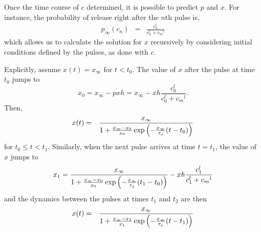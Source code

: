 \documentclass[10pt]{article}
\begin{document}
Once the time course of $c$ determined, it is possible to predict $p$ and $x$. For instance, the probability of release right after the $n$th pulse is,
\begin{eqnarray}
p_{\infty}(c_n) &=& \frac{c_n^l}{c_n ^l + {c_m}^l} 
\end{eqnarray}
which allows us to calculate the solution for $x$ recursively by considering initial conditions defined by the pulses, as done with $c$. 

Explicitly, assume $x(t) = x_{\infty}$ for $t<t_0$.  The value of $x$ after the pulse at time $t_0$ jumps to 
$$
x_0 = x_{\infty} - p x h = x_{\infty} - x h \frac{c_0^l}{c_0^l + {c_m}^l}. 
$$
Then, 
\begin{eqnarray}
x(t) &=& \frac{x_{\infty}}{1 + \frac{x_{\infty}- x_0}{x_0}\exp\left(-\frac{x_{\infty}}{\tau_x} (t-t_0)\right)}
\end{eqnarray}
for $t_0\leq t < t_1$. Similarly, when the next pulse arrives at time $t=t_1$, the value of $x$ jumps to 
\begin{eqnarray}
x_1= \frac{x_{\infty}}{1 + \frac{x_{\infty}- x_0}{x_0}\exp\left(-\frac{x_{\infty}}{\tau_x} (t_1-t_0)\right)} - x h \frac{c_1^l}{c_1 ^l + {c_m}^l}
\end{eqnarray}
and the dynamics between the pulses at times $t_1$ and $t_2$ are then
\begin{eqnarray}
x(t) &=& \frac{x_{\infty}}{1 + \frac{x_{\infty}- x_1}{x_1}\exp\left(-\frac{x_{\infty}}{\tau_x} (t-t_1)\right)}
\end{eqnarray}
\end{document}
